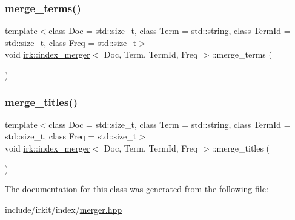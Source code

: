 \mbox{\label{classirk_1_1index__merger_a7109f40e5fc0213d5c72cd3eda9ccaa5}} 
\subsubsection{\texorpdfstring{merge\+\_\+terms()}{merge\_terms()}}
{\footnotesize\ttfamily template$<$class Doc  = std\+::size\+\_\+t, class Term  = std\+::string, class Term\+Id  = std\+::size\+\_\+t, class Freq  = std\+::size\+\_\+t$>$ \\
void \mbox{\hyperlink{classirk_1_1index__merger}{irk\+::index\+\_\+merger}}$<$ Doc, Term, Term\+Id, Freq $>$\+::merge\+\_\+terms (\begin{DoxyParamCaption}{ }\end{DoxyParamCaption})\hspace{0.3cm}{\ttfamily [inline]}}

\mbox{\label{classirk_1_1index__merger_a82a8c5def4100f2cd1be63a037a3a570}} 
\subsubsection{\texorpdfstring{merge\+\_\+titles()}{merge\_titles()}}
{\footnotesize\ttfamily template$<$class Doc  = std\+::size\+\_\+t, class Term  = std\+::string, class Term\+Id  = std\+::size\+\_\+t, class Freq  = std\+::size\+\_\+t$>$ \\
void \mbox{\hyperlink{classirk_1_1index__merger}{irk\+::index\+\_\+merger}}$<$ Doc, Term, Term\+Id, Freq $>$\+::merge\+\_\+titles (\begin{DoxyParamCaption}{ }\end{DoxyParamCaption})\hspace{0.3cm}{\ttfamily [inline]}}



The documentation for this class was generated from the following file\+:\begin{DoxyCompactItemize}
\item 
include/irkit/index/\mbox{\hyperlink{merger_8hpp}{merger.\+hpp}}\end{DoxyCompactItemize}
